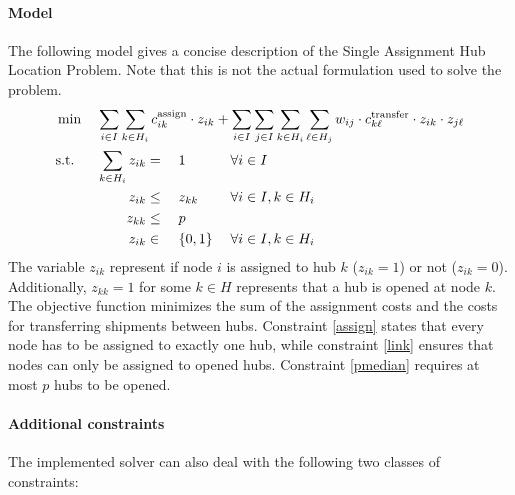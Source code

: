 \documentclass{article}
\begin{document}
\paragraph{Model}
The following model gives a concise description of the Single Assignment Hub Location Problem.
Note that this is not the actual formulation used to solve the problem.
\begin{alignat}{20}
     & \min \;& \sum_{i \in I}\sum_{k \in H_i} c_{ik}^\mathrm{assign} \cdot z_{ik} + \sum_{i \in I}\sum_{j \in I}\sum_{k \in H_i}\sum_{\ell \in H_j} w_{ij} \cdot c_{k\ell}^\mathrm{transfer} \cdot z_{ik} \cdot z_{j\ell}\span\span\span\span\span\span\span\span\span\span \\
     & \text{s.t.} & \sum_{k \in H_i} z_{ik} & = & \; & 1 & \; & \forall i \in I \label{assign} \\
     & & z_{ik} & \leq && z_{kk} && \forall i \in I, k \in H_i \label{link}\\
     & & z_{kk} & \leq && p      \label{pmedian}\\
     & & z_{ik} & \in && \{0,1\} &\;& \forall i \in I, k \in H_i 
\end{alignat}
The variable \(z_{ik}\) represent if node \(i\) is assigned to hub \(k\) (\(z_{ik} = 1\)) or not (\(z_{ik} = 0\)).
Additionally, \(z_{kk} = 1\) for some \(k \in H\) represents that a hub is opened at node \(k\).
The objective function minimizes the sum of the assignment costs and the costs for transferring shipments between hubs.
Constraint \eqref{assign} states that every node has to be assigned to exactly one hub, while constraint \eqref{link} ensures that nodes can only be assigned to opened hubs.
Constraint \eqref{pmedian} requires at most \(p\) hubs to be opened.

\paragraph{Additional constraints}
The implemented solver can also deal with the following two classes of constraints:
\end{document}
